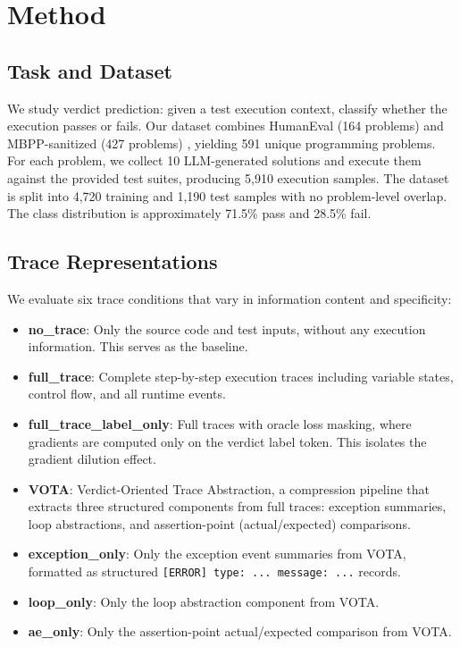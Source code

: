 \documentclass[11pt]{article}
\begin{document}
\section{Method}
\label{sec:method}

\subsection{Task and Dataset}
\label{sec:dataset}

We study verdict prediction: given a test execution context, classify whether the execution passes or fails. Our dataset combines HumanEval (164 problems) \citep{chen2021codex} and MBPP-sanitized (427 problems) \citep{austin2021mbpp}, yielding 591 unique programming problems. For each problem, we collect 10 LLM-generated solutions and execute them against the provided test suites, producing 5,910 execution samples. The dataset is split into 4,720 training and 1,190 test samples with no problem-level overlap. The class distribution is approximately 71.5\% pass and 28.5\% fail.

\subsection{Trace Representations}

We evaluate six trace conditions that vary in information content and specificity:

\begin{itemize}
    \item \textbf{no\_trace}: Only the source code and test inputs, without any execution information. This serves as the baseline.
    \item \textbf{full\_trace}: Complete step-by-step execution traces including variable states, control flow, and all runtime events.
    \item \textbf{full\_trace\_label\_only}: Full traces with oracle loss masking, where gradients are computed only on the verdict label token. This isolates the gradient dilution effect.
    \item \textbf{VOTA}: Verdict-Oriented Trace Abstraction, a compression pipeline that extracts three structured components from full traces: exception summaries, loop abstractions, and assertion-point (actual/expected) comparisons.
    \item \textbf{exception\_only}: Only the exception event summaries from VOTA, formatted as structured \texttt{[ERROR] type: ... message: ...} records.
    \item \textbf{loop\_only}: Only the loop abstraction component from VOTA.
    \item \textbf{ae\_only}: Only the assertion-point actual/expected comparison from VOTA.
\end{itemize}
\end{document}
